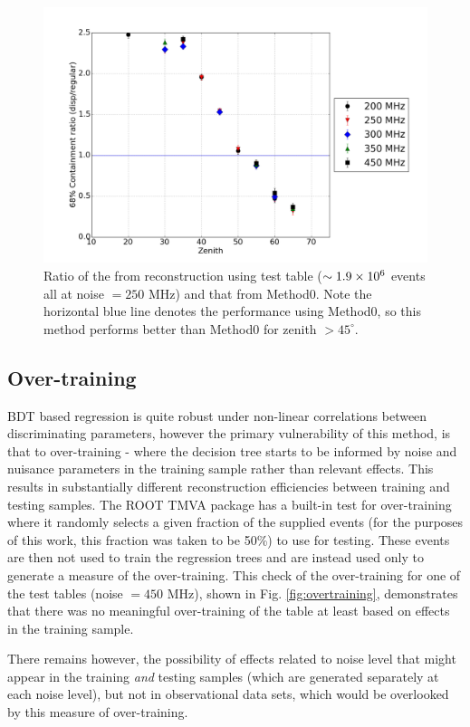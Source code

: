 \documentclass[main.tex]{subfiles}
\begin{document}
\begin{figure}[htbp]
  \centering
  \includegraphics[width=0.8\linewidth]{images/disp_250_ratio_xzen}
  \caption[Test \disp table reconstruction (noise = $250$ MHz).]{Ratio of the \rse from reconstruction using test \disp table ($\sim 1.9\times 10^{6}$ events all at noise $= 250$ MHz) and that from Method0. Note the horizontal blue line denotes the performance using Method0, so this method performs better than Method0 for zenith $>45^\circ$.}
  \label{fig:disp_ratio_250}
\end{figure}

\subsection{Over-training}
BDT based regression is quite robust under non-linear correlations between discriminating parameters, however the primary vulnerability of this method, is that  to over-training - where the decision tree starts to be informed by noise and nuisance parameters in the training sample rather than relevant effects. This results in substantially different reconstruction efficiencies between training and testing samples. The ROOT TMVA package has a built-in test for over-training where it randomly selects a given fraction of the supplied events (for the purposes of this work, this fraction was taken to be 50\%) to use for testing. These events are then not used to train the regression trees and are instead used only to generate a measure of the over-training.
This check of the over-training for one of the test tables (noise $= 450$ MHz), shown in Fig. \ref{fig:overtraining}, demonstrates that there was no meaningful over-training of the table at least based on effects in the training sample.

There remains however, the possibility of effects related to noise level that might appear in the training \textit{and} testing samples (which are generated separately at each noise level), but not in observational data sets, which would be overlooked by this measure of over-training.
\end{document}
